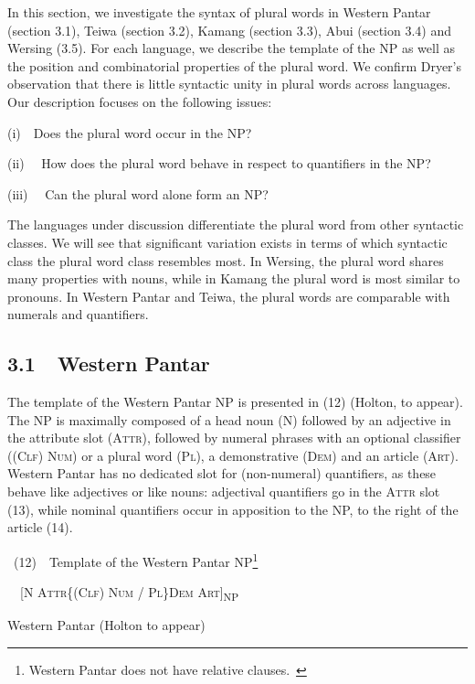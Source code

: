 In this section, we investigate the syntax of plural words in Western Pantar (section 3.1), Teiwa (section 3.2), Kamang (section 3.3), Abui (section 3.4) and Wersing (3.5). For each language, we describe the template of the NP as well as the position and combinatorial properties of the plural word. We confirm Dryer{\textquoteright}s observation that there is little syntactic unity in plural words across languages. Our description focuses on the following issues: 

(i)\ \ Does the plural word occur in the NP? 

(ii)  \ \ How does the plural word behave in respect to quantifiers in the NP? 

(iii) \ \ Can the plural word alone form an NP? 

The languages under discussion differentiate the plural word from other syntactic classes. We will see that significant variation exists in terms of which syntactic class the plural word class resembles most. In Wersing, the plural word shares many properties with nouns, while in Kamang the plural word is most similar to pronouns. In Western Pantar and Teiwa, the plural words are comparable with numerals and quantifiers. 

\subsection[3.1\ \ Western Pantar ]{3.1\ \ Western Pantar }
The template of the Western Pantar NP is presented in (12) (Holton, to appear). The NP is maximally composed of a head noun (N) followed by an adjective in the attribute slot (\textsc{Attr),} followed by numeral phrases with an optional classifier (\textsc{(Clf) Num) }or a plural word (\textsc{Pl), }a demonstrative \textsc{(Dem)} and an article \textsc{(Art)}. Western Pantar has no dedicated slot for (non-numeral) quantifiers, as these behave like adjectives or like nouns: adjectival quantifiers go in the A\textsc{ttr} slot (13), while nominal quantifiers occur in apposition to the NP, to the right of the article (14).

~(12)\ \ Template of the Western Pantar NP\footnote{Western Pantar does not have relative clauses.~}

\ \ [\textsc{N  Attr\{(Clf) Num / Pl\}Dem  Art]}\textsc{\textsubscript{NP}}

Western Pantar (Holton to appear)

